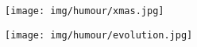 	\begin{center}
	\texttt{[image: img/humour/xmas.jpg]}
	\end{center}
	
	\begin{center}\underline{\hspace{5 cm}}\end{center}	
	\begin{center}
		\texttt{[image: img/humour/evolution.jpg]}
	\end{center}